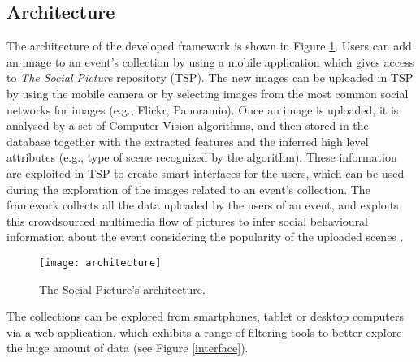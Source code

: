 \subsection{Architecture}
The architecture of the developed framework is shown in Figure \ref{architecture}.
Users can add an image to an event's collection by using a mobile application which gives access to \textit{The Social Picture} repository (TSP). The new images can be uploaded in TSP by using the mobile camera or by selecting images from the most common social networks for images (e.g., Flickr, Panoramio).
Once an image is uploaded, it is analysed by a set of Computer Vision algorithms, and then stored in the database together with the extracted features and the inferred high level attributes (e.g., type of scene recognized by the algorithm). These information are exploited in TSP to create smart interfaces for the users, which can be used during the exploration of the images related to an event's collection.
The framework collects all the data uploaded by the users of an event, and exploits this crowdsourced multimedia flow of pictures to infer social behavioural information about the event considering the popularity of the uploaded scenes \cite{Ortis2015n525}.
\begin{figure}[t]
	\centering
	\texttt{[image: architecture]}
	\caption{The Social Picture's architecture.}
	\label{architecture}
\end{figure}
The collections can be explored from smartphones, tablet or desktop computers via a web application, which exhibits a range of filtering tools to better explore the huge amount of data (see Figure \ref{interface}).
